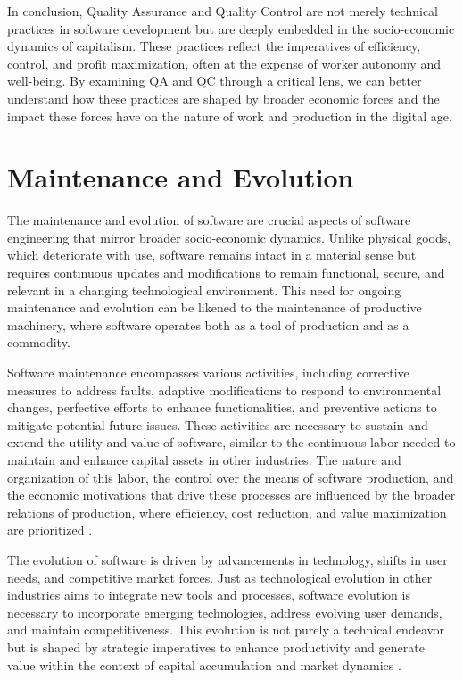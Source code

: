 \begin{refsection}
In conclusion, Quality Assurance and Quality Control are not merely technical practices in software development but are deeply embedded in the socio-economic dynamics of capitalism. These practices reflect the imperatives of efficiency, control, and profit maximization, often at the expense of worker autonomy and well-being. By examining QA and QC through a critical lens, we can better understand how these practices are shaped by broader economic forces and the impact these forces have on the nature of work and production in the digital age.

\section{Maintenance and Evolution}

The maintenance and evolution of software are crucial aspects of software engineering that mirror broader socio-economic dynamics. Unlike physical goods, which deteriorate with use, software remains intact in a material sense but requires continuous updates and modifications to remain functional, secure, and relevant in a changing technological environment. This need for ongoing maintenance and evolution can be likened to the maintenance of productive machinery, where software operates both as a tool of production and as a commodity.

Software maintenance encompasses various activities, including corrective measures to address faults, adaptive modifications to respond to environmental changes, perfective efforts to enhance functionalities, and preventive actions to mitigate potential future issues. These activities are necessary to sustain and extend the utility and value of software, similar to the continuous labor needed to maintain and enhance capital assets in other industries. The nature and organization of this labor, the control over the means of software production, and the economic motivations that drive these processes are influenced by the broader relations of production, where efficiency, cost reduction, and value maximization are prioritized \cite[pp.~1-8]{pressman2014software}.

The evolution of software is driven by advancements in technology, shifts in user needs, and competitive market forces. Just as technological evolution in other industries aims to integrate new tools and processes, software evolution is necessary to incorporate emerging technologies, address evolving user demands, and maintain competitiveness. This evolution is not purely a technical endeavor but is shaped by strategic imperatives to enhance productivity and generate value within the context of capital accumulation and market dynamics \cite[pp.~529-534]{lehman1980programs}.


\end{refsection}
